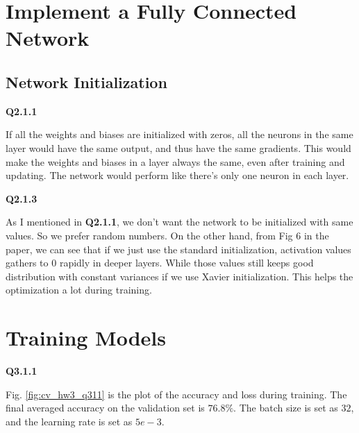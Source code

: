 \documentclass[
  course = {{16-720B Computer Vision}},
  quartile = {{1}},
  assignment = 3-Neural\ Networks\ for\ Recognition,
  name = {{Kangle Deng}},
  email = {{kangled@andrew.cmu.edu}},
  firstexercise = 1
]{aga-homework}
\begin{document}
\section{Implement a Fully Connected Network}
\subsection{Network Initialization}
\noindent\textbf{Q2.1.1} 

If all the weights and biases are initialized with zeros, all the neurons in the same layer would have the same output, and thus have the same gradients. This would make the weights and biases in a layer always the same, even after training and updating. The network would perform like there's only one neuron in each layer.

\noindent \textbf{Q2.1.3}

As I mentioned in \textbf{Q2.1.1}, we don't want the network to be initialized with same values. So we prefer random numbers. On the other hand, from Fig 6 in the paper, we can see that if we just use the standard initialization, activation values gathers to $0$ rapidly in deeper layers. While those values still keeps good distribution with constant variances if we use Xavier initialization. This helps the optimization a lot during training.


\section{Training Models}
\noindent \textbf{Q3.1.1}

Fig. \ref{fig:cv_hw3_q311} is the plot of the accuracy and loss during training. The final averaged accuracy on the validation set is $76.8\%$. The batch size is set as $32$, and the learning rate is set as $5e-3$.
\end{document}
